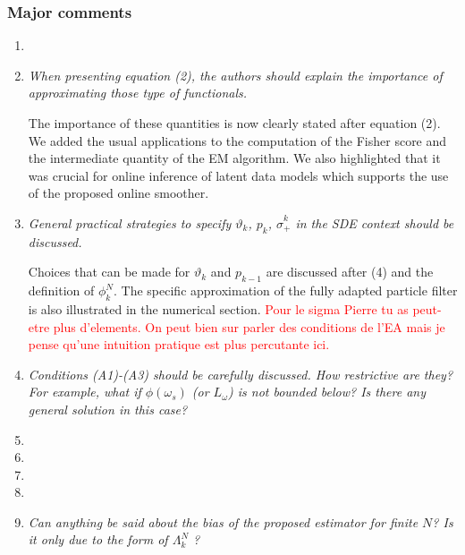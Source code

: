\documentclass[12pt]{article}
\newcommand{\1}{\mathrm{1}}
\begin{document}
\subsubsection*{Major comments}
\begin{enumerate}
\item
\item {\em When presenting equation (2), the authors should explain the importance of approximating those type of functionals.}

\vspace{.3cm}

The importance of these quantities is now clearly stated after equation (2). We added the usual applications to the computation of the Fisher score and the intermediate quantity of the EM algorithm. We also highlighted that it was crucial for online inference of latent data models which supports the use of the proposed online smoother.

\item {\em General practical strategies to specify $\vartheta_k$, $p_k$, $\hat{\sigma}_+^k$ in the SDE context should be
discussed.}

\vspace{.3cm}

Choices that can be made for  $\vartheta_k$ and $p_{k-1}$ are discussed after (4) and the definition of $\phi_k^N$. The specific approximation of the fully adapted particle filter is also illustrated in the numerical section. \textcolor{red}{Pour le sigma Pierre tu as peut-etre plus d'elements. On peut bien sur parler des conditions de l'EA mais je pense qu'une intuition pratique est plus percutante ici.}

\item {\em Conditions (A1)-(A3) should be carefully discussed. How restrictive are they? For
example, what if $\phi(\omega_s)$ (or $L_\omega$) is not bounded below? Is there any general solution
in this case?}

\vspace{.3cm}

\item
\item
\item
\item
\item {\em Can anything be said about the bias of the proposed estimator for finite $N$? Is it
only due to the form of  $\Lambda_k^N$ ?}

\vspace{.3cm}


\end{enumerate}
\end{document}
